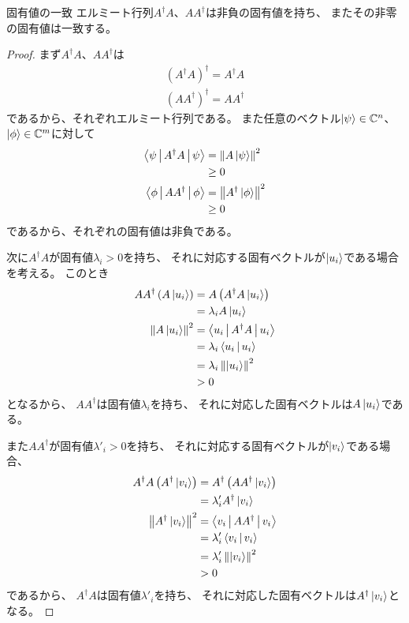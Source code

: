 \documentclass[a4paper, 10pt]{jsarticle}
\begin{document}
\begin{lem}{}{固有値の一致}
	エルミート行列$A^\dagger A$、$A A^\dagger$は非負の固有値を持ち、
	またその非零の固有値は一致する。
\end{lem}
\begin{proof}
	まず$A^\dagger A$、$A A^\dagger$は
	\begin{gather}
		\left( A^\dagger A \right)^\dagger
		= A^\dagger A \\
		\left( A A^\dagger \right)^\dagger
		= A A^\dagger
	\end{gather}
	であるから、それぞれエルミート行列である。
	また任意のベクトル$\Ket{\psi} \in \mathbb{C}^n$、
	$\Ket{\phi} \in \mathbb{C}^m$に対して
	\begin{align}
		\Braket{\psi | A^\dagger A | \psi}
		&= \left\| A \Ket{\psi} \right\|^2 \\
		&\geq 0 \\
		\Braket{\phi | A A^\dagger | \phi}
		&= \left\| A^\dagger \Ket{\phi} \right\|^2 \\
		&\geq 0
	\end{align}
	であるから、それぞれの固有値は非負である。

	次に$A^\dagger A$が固有値$\lambda_i > 0$を持ち、
	それに対応する固有ベクトルが$\Ket{u_i}$である場合を考える。
	このとき
	\begin{align}
		A A^\dagger \left( A \Ket{u_i} \right)
		&= A \left( A^\dagger A \Ket{u_i} \right) \\
		&= \lambda_i A \Ket{u_i} \\
		\left\| A \Ket{u_i} \right\|^2
		&= \Braket{u_i | A^\dagger A | u_i} \\
		&= \lambda_i \Braket{u_i | u_i} \\
		&= \lambda_i \left\| \Ket{u_i} \right\|^2 \\
		&> 0
	\end{align}
	となるから、
	$A A^\dagger$は固有値$\lambda_i$を持ち、
	それに対応した固有ベクトルは$A \Ket{u_i}$である。

	また$A A^\dagger$が固有値$\lambda'_i > 0$を持ち、
	それに対応する固有ベクトルが$\Ket{v_i}$である場合、
	\begin{align}
		A^\dagger A \left( A^\dagger \Ket{v_i} \right)
		&= A^\dagger \left( A A^\dagger \Ket{v_i} \right) \\
		&= \lambda'_i A^\dagger \Ket{v_i} \\
		\left\| A^\dagger \Ket{v_i} \right\|^2
		&= \Braket{v_i | A A^\dagger | v_i} \\
		&= \lambda'_i \Braket{v_i | v_i} \\
		&= \lambda'_i \left\| \Ket{v_i} \right\|^2 \\
		&> 0
	\end{align}
	であるから、
	$A^\dagger A$は固有値$\lambda'_i$を持ち、
	それに対応した固有ベクトルは$A^\dagger \Ket{v_i}$となる。
\end{proof}
\end{document}
